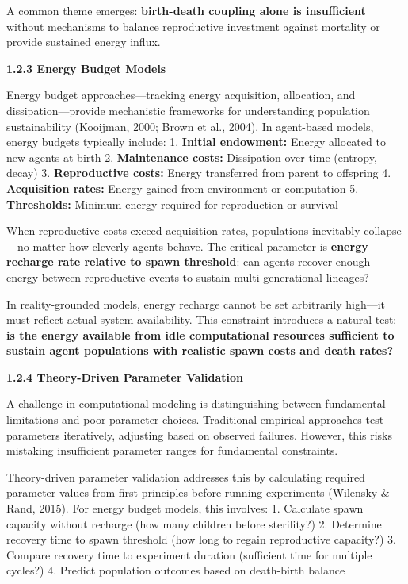 \documentclass[
]{article}
\begin{document}
A common theme emerges: \textbf{birth-death coupling alone is
insufficient} without mechanisms to balance reproductive investment
against mortality or provide sustained energy influx.

\textbf{1.2.3 Energy Budget Models}

Energy budget approaches---tracking energy acquisition, allocation, and
dissipation---provide mechanistic frameworks for understanding
population sustainability (Kooijman, 2000; Brown et al., 2004). In
agent-based models, energy budgets typically include: 1. \textbf{Initial
endowment:} Energy allocated to new agents at birth 2.
\textbf{Maintenance costs:} Dissipation over time (entropy, decay) 3.
\textbf{Reproductive costs:} Energy transferred from parent to offspring
4. \textbf{Acquisition rates:} Energy gained from environment or
computation 5. \textbf{Thresholds:} Minimum energy required for
reproduction or survival

When reproductive costs exceed acquisition rates, populations inevitably
collapse---no matter how cleverly agents behave. The critical parameter
is \textbf{energy recharge rate relative to spawn threshold}: can agents
recover enough energy between reproductive events to sustain
multi-generational lineages?

In reality-grounded models, energy recharge cannot be set arbitrarily
high---it must reflect actual system availability. This constraint
introduces a natural test: \textbf{is the energy available from idle
computational resources sufficient to sustain agent populations with
realistic spawn costs and death rates?}

\textbf{1.2.4 Theory-Driven Parameter Validation}

A challenge in computational modeling is distinguishing between
fundamental limitations and poor parameter choices. Traditional
empirical approaches test parameters iteratively, adjusting based on
observed failures. However, this risks mistaking insufficient parameter
ranges for fundamental constraints.

Theory-driven parameter validation addresses this by calculating
required parameter values from first principles before running
experiments (Wilensky \& Rand, 2015). For energy budget models, this
involves: 1. Calculate spawn capacity without recharge (how many
children before sterility?) 2. Determine recovery time to spawn
threshold (how long to regain reproductive capacity?) 3. Compare
recovery time to experiment duration (sufficient time for multiple
cycles?) 4. Predict population outcomes based on death-birth balance
\end{document}
